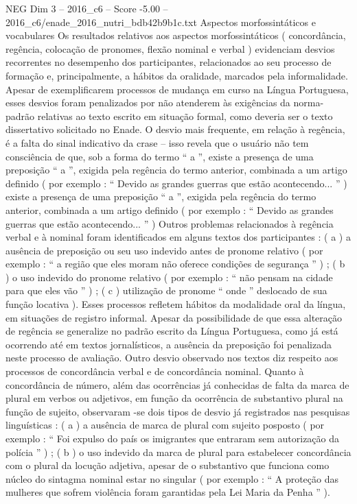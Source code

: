 \begin{textsample}{NEG Dim 3 – 2016\_c6 – Score -5.00 – 2016\_c6/enade\_2016\_nutri\_bdb42b9b1c.txt}
Aspectos morfossintáticos e vocabulares Os resultados relativos aos aspectos morfossintáticos ( concordância, regência, colocação de pronomes, flexão nominal e verbal ) evidenciam desvios recorrentes no desempenho dos participantes, relacionados ao seu processo de formação e, principalmente, a hábitos da oralidade, marcados pela informalidade.
Apesar de exemplificarem processos de mudança em curso na Língua Portuguesa, esses desvios foram penalizados por não atenderem às exigências da norma-padrão relativas ao texto escrito em situação formal, como deveria ser o texto dissertativo solicitado no Enade.
O desvio mais frequente, em relação à regência, é a falta do sinal indicativo da crase – isso revela que o usuário não tem consciência de que, sob a forma do termo “ a ”, existe a presença de uma preposição “ a ”, exigida pela regência do termo anterior, combinada a um artigo definido ( por exemplo : “ Devido as grandes guerras que estão acontecendo... ” ) existe a presença de uma preposição “ a ”, exigida pela regência do termo anterior, combinada a um artigo definido ( por exemplo : “ Devido as grandes guerras que estão acontecendo... ” ) Outros problemas relacionados à regência verbal e à nominal foram identificados em alguns textos dos participantes : ( a ) a ausência de preposição ou seu uso indevido antes de pronome relativo ( por exemplo : “ a região que eles moram não oferece condições de segurança ” ) ; ( b ) o uso indevido do pronome relativo ( por exemplo : “ não pensam na cidade para que eles vão ” ) ; ( c ) utilização de pronome “ onde ” deslocado de sua função locativa ).
Esses processos refletem hábitos da modalidade oral da língua, em situações de registro informal.
Apesar da possibilidade de que essa alteração de regência se generalize no padrão escrito da Língua Portuguesa, como já está ocorrendo até em textos jornalísticos, a ausência da preposição foi penalizada neste processo de avaliação.
Outro desvio observado nos textos diz respeito aos processos de concordância verbal e de concordância nominal.
Quanto à concordância de número, além das ocorrências já conhecidas de falta da marca de plural em verbos ou adjetivos, em função da ocorrência de substantivo plural na função de sujeito, observaram -se dois tipos de desvio já registrados nas pesquisas linguísticas : ( a ) a ausência de marca de plural com sujeito posposto ( por exemplo : “ Foi expulso do país os imigrantes que entraram sem autorização da polícia ” ) ; ( b ) o uso indevido da marca de plural para estabelecer concordância com o plural da locução adjetiva, apesar de o substantivo que funciona como núcleo do sintagma nominal estar no singular ( por exemplo : “ A proteção das mulheres que sofrem violência foram garantidas pela Lei Maria da Penha ” ).

\end{textsample}
